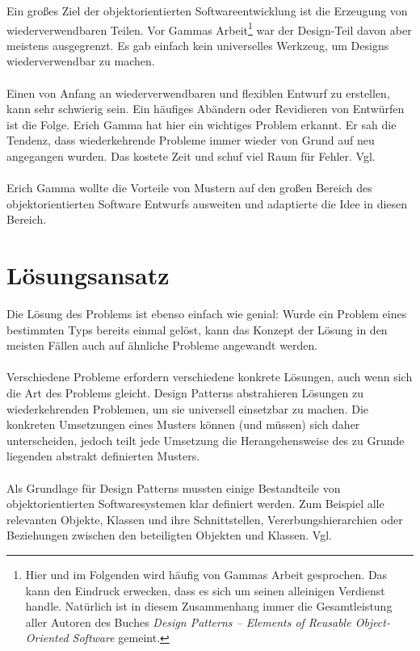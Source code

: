 \documentclass[fontsize=11pt,a4paper,final]{scrreprt}[2003/01/01]
\begin{document}
Ein großes Ziel der objektorientierten Softwareentwicklung ist die Erzeugung von wiederverwendbaren Teilen. Vor Gammas Arbeit\footnote{Hier und im Folgenden wird häufig von \glqq Gammas Arbeit\grqq{} gesprochen. Das kann den Eindruck erwecken, dass es sich um seinen alleinigen Verdienst handle. Natürlich ist in diesem Zusammenhang immer die Gesamtleistung aller Autoren des Buches \textit{Design Patterns – Elements of Reusable Object-Oriented Software} \cite{gamma2004} gemeint.} war der Design-Teil davon aber meistens ausgegrenzt. Es gab einfach kein universelles Werkzeug, um Designs wiederverwendbar zu machen.
\\ \\
Einen von Anfang an wiederverwendbaren und flexiblen Entwurf zu erstellen, kann sehr schwierig sein. Ein häufiges Abändern oder Revidieren von Entwürfen ist die Folge. Erich Gamma hat hier ein wichtiges Problem erkannt. Er sah die Tendenz, dass wiederkehrende Probleme immer wieder von Grund auf neu angegangen wurden. Das kostete Zeit und schuf viel Raum für Fehler. Vgl. \cite[S. 1]{gamma2004}
\\ \\
Erich Gamma wollte die Vorteile von Mustern auf den großen Bereich des objektorientierten Software Entwurfs ausweiten und adaptierte die Idee in diesen Bereich.

\section{Lösungsansatz}\label{se:Lösungsansatz}

Die Lösung des Problems ist ebenso einfach wie genial: Wurde ein Problem eines bestimmten Typs bereits einmal gelöst, kann das Konzept der Lösung in den meisten Fällen auch auf ähnliche Probleme angewandt werden.
\\ \\
Verschiedene Probleme erfordern verschiedene konkrete Lösungen, auch wenn sich die Art des Problems gleicht. Design Patterns abstrahieren Lösungen zu wiederkehrenden Problemen, um sie universell einsetzbar zu machen. Die konkreten Umsetzungen eines Musters können (und müssen) sich daher unterscheiden, jedoch teilt jede Umsetzung die Herangehensweise des zu Grunde liegenden abstrakt definierten Musters.
\\ \\
Als Grundlage für Design Patterns mussten einige Bestandteile von objektorientierten Softwaresystemen klar definiert werden. Zum Beispiel alle relevanten Objekte, Klassen und ihre Schnittstellen, Vererbungshierarchien oder Beziehungen zwischen den beteiligten Objekten und Klassen. Vgl. \cite[S. 1]{gamma2004}
\end{document}

